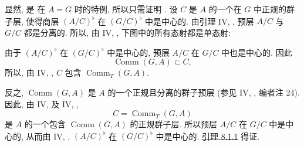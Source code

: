 显然, \textup{}
是 \textup{} 在 \(A=G\) 时的特例,
所以只需证明 \textup{}.
设 \(C\) 是 \(A\) 的一个在 \(G\) 中正规的群子层,
使得商层 \((A/C)^\flat\) 在 \((G/C)^\flat\) 中是中心的.
由引理 IV, ,
预层 \(A/C\) 与 \(G/C\) 都是分离的.
所以, 由 IV, ,
下图中的所有态射都是单态射:
\begin{center}
  \label{diag:sga3-VIB-8.1.1-monomorphisms}%
\end{center}
由于 \((A/C)^\flat\) 在 \((G/C)^\flat\) 中是中心的,
预层 \(A/C\) 在 \(G/C\) 中也是中心的. 因此
\[
  \operatorname{Comm}(G,A)\subset C,
\]
所以, 由 IV, ,
\(C\) 包含 \(\operatorname{Comm}_T(G,A)\).

反之, \(\operatorname{Comm}(G,A)\) 是 \(A\) 的一个正规且分离的群子预层
(参见 IV, , 编者注 24).
因此, 由 IV,
\textup{}
及 IV, ,
\[
  C=\operatorname{Comm}_T(G,A)
\]
是 \(A\) 的一个包含 \(\operatorname{Comm}(G,A)\) 的正规群子层.
所以预层 \(A/C\) 在 \(G/C\) 中是中心的,
从而由 IV,
\textup{},
\((A/C)^\flat\) 在 \((G/C)^\flat\) 中是中心的.
\hyperref[lem:sga3-VIB-8.1.1]{引理 8.1.1} 得证.

